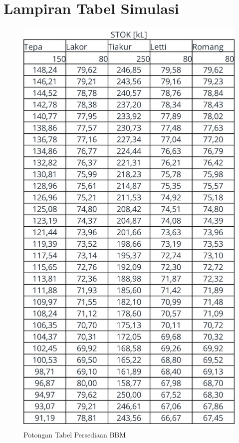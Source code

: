 \section*{Lampiran Tabel Simulasi}
\label{sec:lampiran-simulasi}

\begin{figure}[!ht]
    \centering
    \includegraphics[width=0.95\linewidth,height=0.95\textheight,keepaspectratio]{lampiran/tabel-stok-simu.jpg}
    \caption*{Potongan Tabel Persediaan BBM}
\end{figure}

